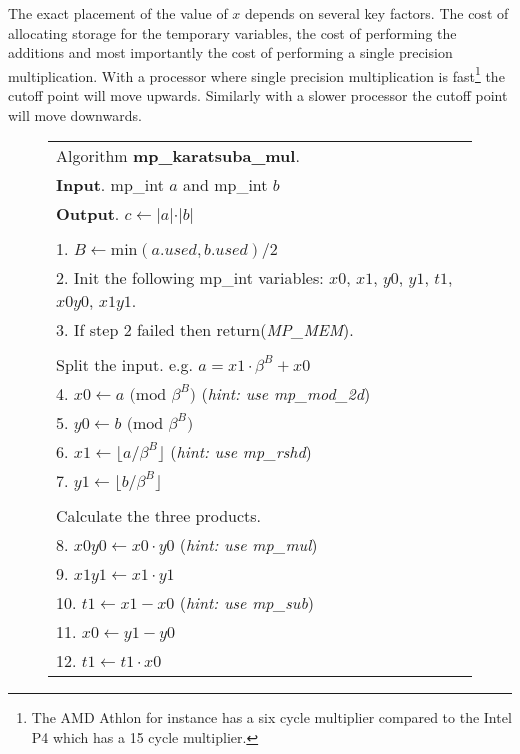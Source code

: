 \documentclass[b5paper]{book}
\begin{document}
The exact placement of the value of $x$ depends on several key factors.   The cost of allocating storage for the temporary variables, the cost of 
performing the additions and most importantly the cost of performing a single precision multiplication.  With a processor where single precision 
multiplication is fast\footnote{The AMD Athlon for instance has a six cycle multiplier compared to the Intel P4 which has a 15 cycle multiplier.} the 
cutoff point will move upwards.  Similarly with a slower processor the cutoff point will move downwards.  

\newpage\begin{figure}[!here]
\begin{small}
\begin{center}
\begin{tabular}{l}
\hline Algorithm \textbf{mp\_karatsuba\_mul}. \\
\textbf{Input}.   mp\_int $a$ and mp\_int $b$ \\
\textbf{Output}.  $c \leftarrow \vert a \vert \cdot \vert b \vert$ \\
\hline \\
1.  $B \leftarrow \mbox{min}(a.used, b.used)/2$ \\
2.  Init the following mp\_int variables: $x0$, $x1$, $y0$, $y1$, $t1$, $x0y0$, $x1y1$.\\
3.  If step 2 failed then return(\textit{MP\_MEM}). \\
\\
Split the input.  e.g. $a = x1 \cdot \beta^B + x0$ \\
4.  $x0 \leftarrow a \mbox{ (mod }\beta^B\mbox{)}$ (\textit{hint: use mp\_mod\_2d}) \\
5.  $y0 \leftarrow b \mbox{ (mod }\beta^B\mbox{)}$ \\
6.  $x1 \leftarrow \lfloor a / \beta^B \rfloor$ (\textit{hint: use mp\_rshd}) \\
7.  $y1 \leftarrow \lfloor b / \beta^B \rfloor$ \\
\\
Calculate the three products. \\
8.  $x0y0 \leftarrow x0 \cdot y0$ (\textit{hint: use mp\_mul}) \\
9.  $x1y1 \leftarrow x1 \cdot y1$ \\
10.  $t1 \leftarrow x1 - x0$ (\textit{hint: use mp\_sub}) \\
11.  $x0 \leftarrow y1 - y0$ \\
12.  $t1 \leftarrow t1 \cdot x0$ \\

\end{tabular}
\end{center}
\end{small}
\end{figure}
\end{document}
